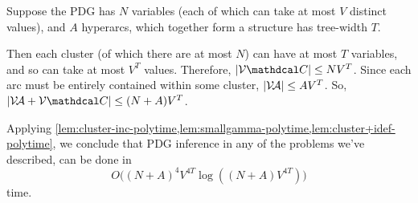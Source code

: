 \documentclass{article}
\begin{document}
\begin{lproof}\label{proof:main}
    Suppose the PDG has $N$ variables 
    (each of which can take at most $V$ distinct values), 
    and $A$ hyperarcs, which together form a structure has tree-width $T$. 
    
    Then each cluster (of which there are at most $N$) 
    can have at most $T$ variables, and so can take at most $V^T$ values.
    Therefore, $|\V \C| \le N V^T$.
    Since each arc must be entirely contained within some cluster, 
    $|\mathcal V\!\mathcal A| \le A V^T$. 
    So, $|\V\!\Ar + \V \C| \le (N+A) V^T$. 
    
    Applying \cref{lem:cluster-inc-polytime,lem:smallgamma-polytime,lem:cluster+idef-polytime}, we conclude that PDG inference in any of the problems we've described, can be done in
    \[
        O\Big(  (N+A)^4 V^{4T} \log ((N+A) V^{4T}) \Big)
    \]
    time.
\end{lproof}

\subsection{}
\end{document}
